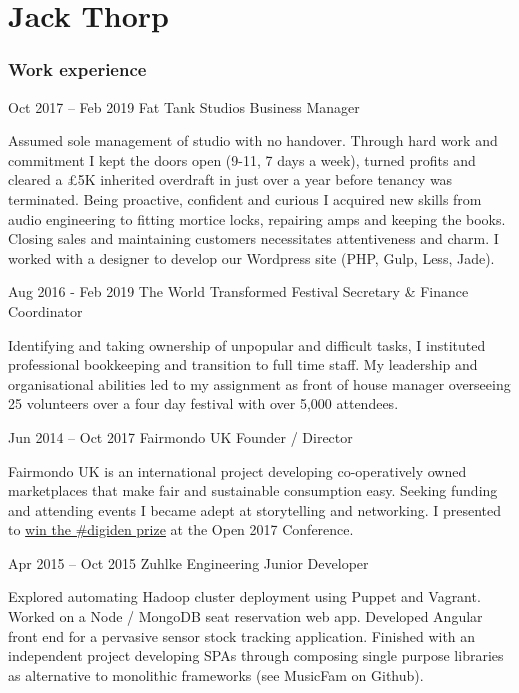 \documentclass[fontsize=10pt]{tccv}
\begin{document}
\part{Jack Thorp}

\section{Work experience}

\begin{eventlist}

\item{Oct 2017 -- Feb 2019}
	{Fat Tank Studios}
	{Business Manager}

Assumed sole management of studio with no handover. Through hard work and commitment I kept the doors open (9-11, 7 days a week), turned profits and cleared a £5K inherited overdraft in just over a year before tenancy was terminated. Being proactive, confident and curious I acquired new skills from audio engineering to fitting mortice locks, repairing amps and keeping the books. Closing sales and maintaining customers necessitates attentiveness and charm. I worked with a designer to develop our Wordpress site (PHP, Gulp, Less, Jade).

\item{Aug 2016 - Feb 2019}
	{The World Transformed Festival}
	{Secretary \& Finance Coordinator}
	
Identifying and taking ownership of unpopular and difficult tasks, I instituted professional bookkeeping and transition to full time staff. My leadership and organisational abilities led to my assignment as front of house manager overseeing 25 volunteers over a four day festival with over 5,000 attendees. 

\item{Jun 2014 -- Oct 2017}
     {Fairmondo UK}
     {Founder / Director}
     
Fairmondo UK is an international project developing co-operatively owned marketplaces that make fair and sustainable consumption easy. Seeking funding and attending events I became adept at storytelling and networking. I presented to \href{https://www.uk.coop/newsroom/co-operative-amazon-wins-first-competition-tech-co-ops} {win the \#digiden prize} at the Open 2017 Conference.

\item{Apr 2015 -- Oct 2015}
     {Zuhlke Engineering}
     {Junior Developer}

Explored automating Hadoop cluster deployment using Puppet and Vagrant. Worked on a Node / MongoDB seat reservation web app. Developed Angular front end for a pervasive sensor stock tracking application. Finished with an independent project developing SPAs through composing single purpose libraries as alternative to monolithic frameworks (see MusicFam on Github).


\end{eventlist}
\end{document}
